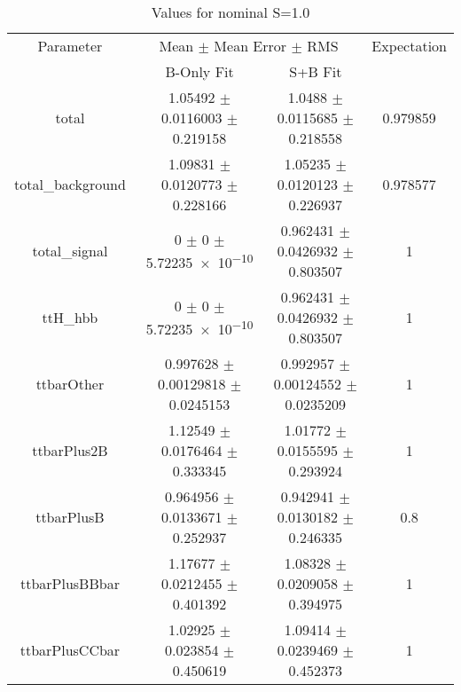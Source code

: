 \begin{table}
\centering
\caption{Values for nominal S=1.0}
\begin{tabular}{cccc}
\toprule
Parameter & \multicolumn{2}{c}{Mean $\pm$ Mean Error $\pm$ RMS} & Expectation\\
 & B-Only Fit & S+B Fit & \\
\midrule
total & \num{1.05492} $\pm$ \num{0.0116003} $\pm$ \num{0.219158} & \num{1.0488} $\pm$ \num{0.0115685} $\pm$ \num{0.218558} & \num{0.979859}\\
total\_background & \num{1.09831} $\pm$ \num{0.0120773} $\pm$ \num{0.228166} & \num{1.05235} $\pm$ \num{0.0120123} $\pm$ \num{0.226937} & \num{0.978577}\\
total\_signal & \num{0} $\pm$ \num{0} $\pm$ \num{5.72235e-10} & \num{0.962431} $\pm$ \num{0.0426932} $\pm$ \num{0.803507} & \num{1}\\
ttH\_hbb & \num{0} $\pm$ \num{0} $\pm$ \num{5.72235e-10} & \num{0.962431} $\pm$ \num{0.0426932} $\pm$ \num{0.803507} & \num{1}\\
ttbarOther & \num{0.997628} $\pm$ \num{0.00129818} $\pm$ \num{0.0245153} & \num{0.992957} $\pm$ \num{0.00124552} $\pm$ \num{0.0235209} & \num{1}\\
ttbarPlus2B & \num{1.12549} $\pm$ \num{0.0176464} $\pm$ \num{0.333345} & \num{1.01772} $\pm$ \num{0.0155595} $\pm$ \num{0.293924} & \num{1}\\
ttbarPlusB & \num{0.964956} $\pm$ \num{0.0133671} $\pm$ \num{0.252937} & \num{0.942941} $\pm$ \num{0.0130182} $\pm$ \num{0.246335} & \num{0.8}\\
ttbarPlusBBbar & \num{1.17677} $\pm$ \num{0.0212455} $\pm$ \num{0.401392} & \num{1.08328} $\pm$ \num{0.0209058} $\pm$ \num{0.394975} & \num{1}\\
ttbarPlusCCbar & \num{1.02925} $\pm$ \num{0.023854} $\pm$ \num{0.450619} & \num{1.09414} $\pm$ \num{0.0239469} $\pm$ \num{0.452373} & \num{1}\\
\bottomrule
\end{tabular}
\end{table}